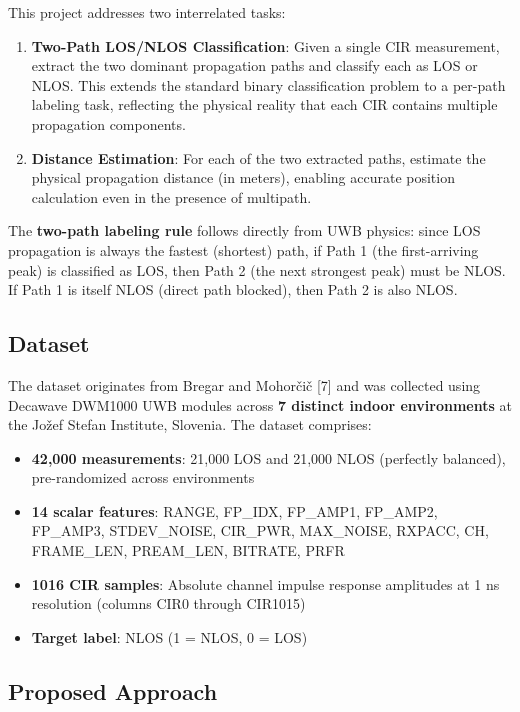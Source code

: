 \documentclass[12pt,a4paper]{article}
\providecommand{\tightlist}{%
  \setlength{\itemsep}{0pt}\setlength{\parskip}{0pt}}
\begin{document}
This project addresses two interrelated tasks:

\begin{enumerate}
\def\labelenumi{\arabic{enumi}.}
\item
  \textbf{Two-Path LOS/NLOS Classification}: Given a single CIR
  measurement, extract the two dominant propagation paths and classify
  each as LOS or NLOS. This extends the standard binary classification
  problem to a per-path labeling task, reflecting the physical reality
  that each CIR contains multiple propagation components.
\item
  \textbf{Distance Estimation}: For each of the two extracted paths,
  estimate the physical propagation distance (in meters), enabling
  accurate position calculation even in the presence of multipath.
\end{enumerate}

The \textbf{two-path labeling rule} follows directly from UWB physics:
since LOS propagation is always the fastest (shortest) path, if Path 1
(the first-arriving peak) is classified as LOS, then Path 2 (the next
strongest peak) must be NLOS. If Path 1 is itself NLOS (direct path
blocked), then Path 2 is also NLOS.

\subsection{Dataset}\label{dataset}

The dataset originates from Bregar and Mohorčič {[}7{]} and was
collected using Decawave DWM1000 UWB modules across \textbf{7 distinct
indoor environments} at the Jožef Stefan Institute, Slovenia. The
dataset comprises:

\begin{itemize}
\tightlist
\item
  \textbf{42,000 measurements}: 21,000 LOS and 21,000 NLOS (perfectly
  balanced), pre-randomized across environments
\item
  \textbf{14 scalar features}: RANGE, FP\_IDX, FP\_AMP1, FP\_AMP2,
  FP\_AMP3, STDEV\_NOISE, CIR\_PWR, MAX\_NOISE, RXPACC, CH, FRAME\_LEN,
  PREAM\_LEN, BITRATE, PRFR
\item
  \textbf{1016 CIR samples}: Absolute channel impulse response
  amplitudes at 1 ns resolution (columns CIR0 through CIR1015)
\item
  \textbf{Target label}: NLOS (1 = NLOS, 0 = LOS)
\end{itemize}

\subsection{Proposed Approach}\label{proposed-approach}
\end{document}
